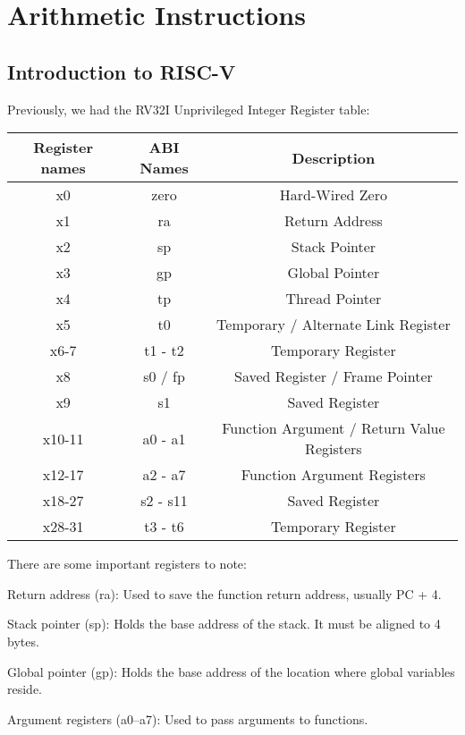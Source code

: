 \chapter{Arithmetic Instructions}

\section{Introduction to RISC-V}
Previously, we had the RV32I Unprivileged Integer Register table: 

\begin{table}[H]
  \centering
  \begin{tabular}{c|c|c}
      \toprule
      Register names & ABI Names & Description \\
    \midrule
      x0 & zero & Hard-Wired Zero  \\
      x1 & ra & Return Address  \\
      x2 & sp & Stack Pointer  \\
      x3 & gp & Global Pointer  \\
      x4 & tp & Thread Pointer  \\
      x5 & t0 & Temporary / Alternate Link Register  \\
      x6-7 & t1 - t2 & Temporary Register  \\
      x8 & s0 / fp & Saved Register / Frame Pointer  \\
      x9 & s1 & Saved Register  \\
      x10-11 & a0 - a1 & Function Argument / Return Value Registers  \\
      x12-17 & a2 - a7 & Function Argument Registers  \\
      x18-27 & s2 - s11 & Saved Register  \\
      x28-31 & t3 - t6 & Temporary Register  \\
      \bottomrule
  \end{tabular}
\end{table}

There are some important registers to note:

Return address (ra): Used to save the function return address, usually PC + 4.

Stack pointer (sp): Holds the base address of the stack. It must be aligned to 4 bytes.

Global pointer (gp): Holds the base address of the location where global variables reside.

Argument registers (a0–a7): Used to pass arguments to functions.

